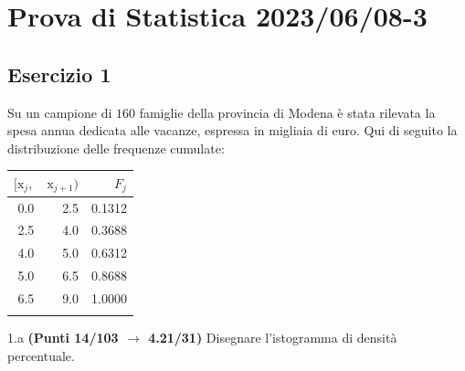 \documentclass[
  11pt,
]{book}
\theoremstyle{mytheoremstyle}
\theoremstyle{mydefstyle}
\begin{document}
\section{Prova di Statistica 2023/06/08-3}\label{prova-di-statistica-20230608-3}

\subsection{Esercizio 1}\label{esercizio-1-27}

Su un campione di \(160\) famiglie della provincia di Modena è stata rilevata la spesa annua dedicata alle vacanze, espressa in migliaia di euro. Qui di seguito la distribuzione delle frequenze cumulate:

\begin{table}[H]
\centering
\begin{tabular}{rrr}
\toprule
$[\text{x}_j,$ & $\text{x}_{j+1})$ & $F_j$\\
\midrule
0.0 & 2.5 & 0.1312\\
2.5 & 4.0 & 0.3688\\
4.0 & 5.0 & 0.6312\\
5.0 & 6.5 & 0.8688\\
6.5 & 9.0 & 1.0000\\
 &  & \\
\bottomrule
\end{tabular}
\end{table}

1.a \textbf{(Punti 14/103 \(\rightarrow\) 4.21/31)} Disegnare l'istogramma di densità percentuale.
\end{document}
